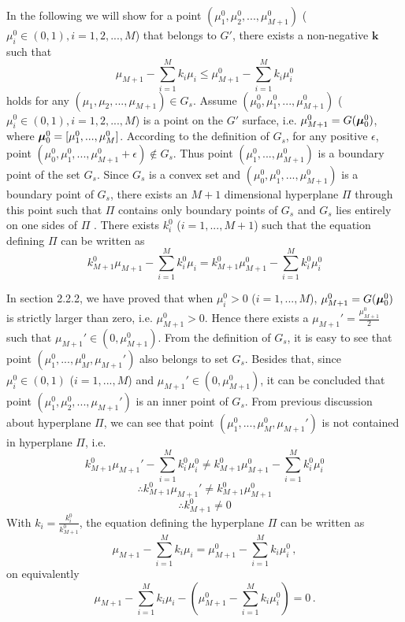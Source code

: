 In the following we will show for a point $(\mu_1^0, \mu_2^0, ..., \mu_{M+1}^0)$ ($\mu_i^0 \in (0, 1), i = 1, 2, ..., M$) that belongs to $G'$, there exists a non-negative $\mathbf{k}$ such that  
\[
\mu_{M+1} - \sum_{i=1}^{M}k_i\mu_i \leq \mu_{M+1}^0 - \sum_{i=1}^{M}k_i\mu_i^0
\]
holds for any $(\mu_1, \mu_2, ..., \mu_{M+1}) \in G_s$. 
Assume $(\mu_0^0, \mu_1^0, ..., \mu_{M+1}^0)$ ($\mu_i^0 \in (0, 1), i = 1, 2, ..., M$) is a point on the $G'$ surface, i.e. $\mu_{M+1}^0 = G(\boldsymbol{\mu}_0^0)$, where $\boldsymbol{\mu}_0^0 = [\mu_1^0, ..., \mu_{M}^0]$. 
According to the definition of $G_s$, for any positive $\epsilon$, point $(\mu_0^0, \mu_1^0, ..., \mu_{M+1}^0+\epsilon) \notin G_s$. Thus point $(\mu_1^0, ..., \mu_{M+1}^0)$ is a boundary point of the set $G_s$.  
Since $G_s$ is a convex set and $(\mu_0^0, \mu_1^0, ..., \mu_{M+1}^0)$ is a boundary point of $G_s$,  
there exists an $M+1$ dimensional hyperplane $\Pi$ through this point such that $\Pi$ contains only boundary points of $G_s$ and $G_s$ lies entirely on one sides of $\Pi$  \cite{dantzig1951fundamental}. 
There exists $k_i^0$ ($i=1, ..., M+1$) such that the equation defining $\Pi$ can be written as \cite{dantzig1951fundamental}
\begin{equation}
\label{PI}
k_{M+1}^0\mu_{M+1} - \sum_{i=1}^{M}k_i^0\mu_i = k_{M+1}^0\mu_{M+1}^0 - \sum_{i=1}^{M}k_i^0\mu_i^0
\end{equation}

In section 2.2.2, we have proved that when $\mu^0_i >  0$ ($i=1, ..., M$), $\mu_{M+1}^0 = G(\boldsymbol{\mu}_0^0) $ is strictly larger than zero, i.e. $\mu_{M+1}^0 > 0$. Hence there exists a $\mu_{M+1}' = \frac{\mu_{M+1}^0}{2}$ such that $\mu_{M+1}' \in (0, \mu_{M+1}^0)$. From the definition of $G_s$, it is easy to see that point $(\mu^0_1, ..., \mu^0_M, \mu_{M+1}')$ also belongs to set $G_s$. Besides that, since $\mu^0_i \in (0, 1)$ ($i=1, ..., M$) and $\mu_{M+1}' \in (0, \mu_{M+1}^0)$, it can be concluded that point $(\mu_1^0, \mu_2^0, ..., \mu_{M+1}')$ is an inner point of $G_s$.
From previous discussion about hyperplane $\Pi$, we can see that point $(\mu^0_1, ..., \mu^0_M, \mu_{M+1}')$ is not contained in hyperplane $\Pi$, i.e.
\[
k_{M+1}^0\mu_{M+1}' - \sum_{i=1}^{M}k_i^0\mu_i^0 \neq k_{M+1}^0\mu_{M+1}^0 - \sum_{i=1}^{M}k_i^0\mu_i^0
\]
\[
\therefore k_{M+1}^0\mu_{M+1}' \neq k_{M+1}^0\mu_{M+1}^0
\]
\[
\therefore k_{M+1}^0 \neq 0
\]
With $k_i = \frac{k_i^0}{k_{M+1}^0}$, the equation defining the hyperplane $\Pi$ can be written as
\begin{equation}
\label{PI2}
\mu_{M+1} - \sum_{i=1}^{M}k_i\mu_i = \mu_{M+1}^0 - \sum_{i=1}^{M}k_i\mu_i^0\,,
\end{equation}
on equivalently 
\begin{equation}
\label{PI2b}
\mu_{M+1} - \sum_{i=1}^{M}k_i\mu_i - (\mu_{M+1}^0 - \sum_{i=1}^{M}k_i\mu_i^0) = 0\,.
\end{equation}

